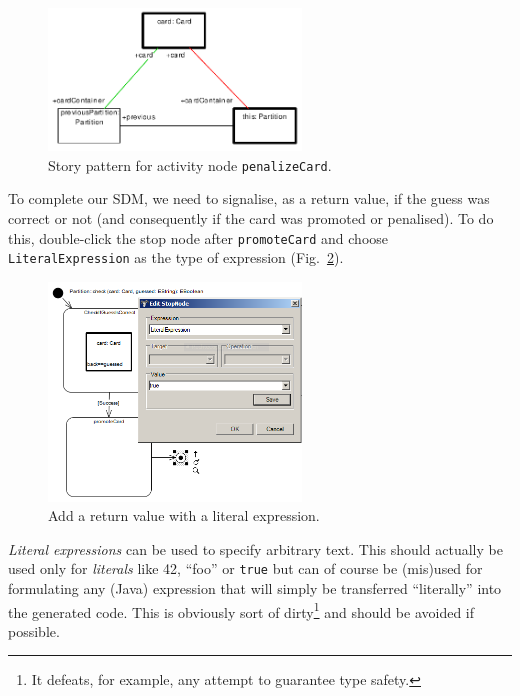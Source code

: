 \begin{figure}[htbp]
\begin{center}
  \includegraphics[width=0.6\textwidth]{pics/sdmBilder/check/sdm38}
  \caption{Story pattern for activity node \texttt{penalizeCard}.}  
  \label{fig:sdm_check_complete_penalize}
\end{center}
\end{figure}

To complete our SDM, we need to signalise, as a return value, if the guess was
correct or not (and consequently if the card was promoted or penalised).  To do
this, double-click the stop node after \texttt{promoteCard} and choose
\texttt{LiteralExpression} as the type of expression
(Fig.~\ref{fig:sdm_check_literal_exp}).  

\begin{figure}[htbp]
\begin{center}
  \includegraphics[width=0.6\textwidth]{pics/sdmBilder/check/sdm39}
  \caption{Add a return value with a literal expression.}  
  \label{fig:sdm_check_literal_exp}
\end{center}
\end{figure}

\emph{Literal expressions} can be used
to specify arbitrary text.  This should actually be used only for
\emph{literals} like 42, ``foo'' or \texttt{true} but can of course be (mis)used
for formulating any (Java) expression that will simply be transferred
``literally'' into the  generated code. This is obviously sort of
dirty\footnote{It defeats, for example, any attempt to guarantee type safety.} 
and should be avoided if possible.
  
